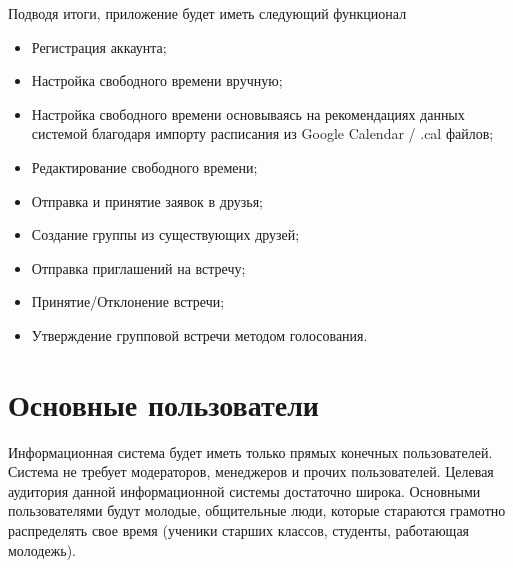 \documentclass[14pt]{extreport}
\begin{document}
Подводя итоги, приложение будет иметь следующий функционал 
\begin{itemize}
    \item Регистрация аккаунта;
    \item Настройка свободного времени вручную;
    \item Настройка свободного времени основываясь на рекомендациях данных системой благодаря импорту расписания из Google Calendar / .cal файлов;
    \item Редактирование свободного времени;
    \item Отправка и принятие заявок в друзья;
    \item Создание группы из существующих друзей;
    \item Отправка приглашений на встречу;
    \item Принятие/Отклонение встречи;
    \item Утверждение групповой встречи методом голосования.
\end{itemize}
\section{Основные пользователи  }

Информационная система будет иметь только прямых конечных пользователей. Система не требует модераторов, менеджеров и прочих пользователей.
Целевая аудитория данной информационной системы достаточно широка. Основными пользователями будут молодые, общительные люди, которые стараются грамотно распределять свое время (ученики старших классов, студенты, работающая молодежь).

\newpage
\end{document}
